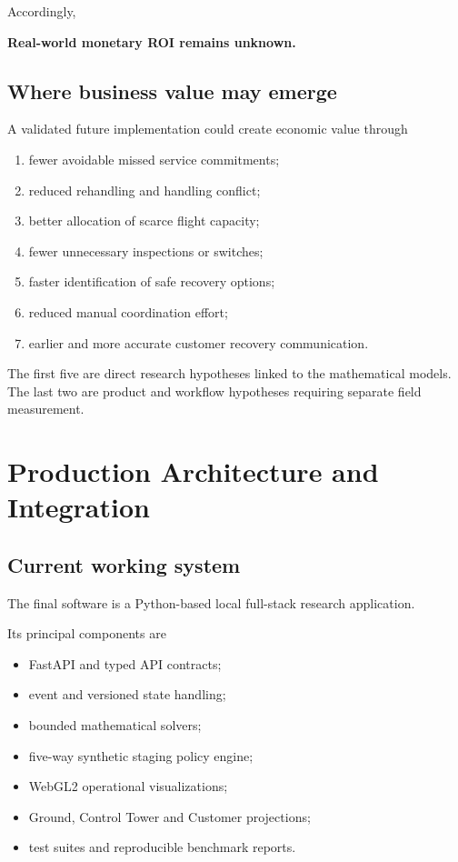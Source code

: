 \documentclass[10pt,a4paper]{article}
\theoremstyle{plain}
\theoremstyle{definition}
\theoremstyle{remark}
\begin{document}
Accordingly,

\begin{center}
\textbf{\color{Navy}
Real-world monetary ROI remains unknown.
}
\end{center}

\subsection{Where business value may emerge}

A validated future implementation
could create economic value through

\begin{enumerate}[
  label=(\roman*),
  leftmargin=18pt,
  itemsep=2pt
]
\item
fewer avoidable missed service commitments;
\item
reduced rehandling and handling conflict;
\item
better allocation of scarce flight capacity;
\item
fewer unnecessary inspections or switches;
\item
faster identification of safe recovery options;
\item
reduced manual coordination effort;
\item
earlier and more accurate
customer recovery communication.
\end{enumerate}

The first five are direct research hypotheses
linked to the mathematical models.
The last two are product and workflow hypotheses
requiring separate field measurement.

\section{Production Architecture and Integration}

\subsection{Current working system}

The final software is a
Python-based local full-stack
research application.

Its principal components are

\begin{itemize}[leftmargin=18pt,itemsep=2pt]
\item FastAPI and typed API contracts;
\item event and versioned state handling;
\item bounded mathematical solvers;
\item five-way synthetic staging policy engine;
\item WebGL2 operational visualizations;
\item Ground, Control Tower and Customer projections;
\item test suites and reproducible benchmark reports.
\end{itemize}
\end{document}
